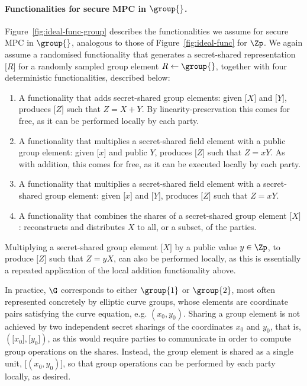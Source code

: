     \paragraph{Functionalities for secure MPC in $\group{}$.}
    Figure~\ref{fig:ideal-func-group} describes the functionalities we assume
    for secure MPC in $\group{}$, analogous to those of
    Figure~\ref{fig:ideal-func} for $\Zp$. We again assume a randomised
    functionality that generates a secret-shared representation $\lbrack
    R\rbrack $ for a randomly sampled group element $R\gets \group{}$, together
    with four deterministic functionalities, described below:

    \begin{enumerate}

      \item A functionality that adds secret-shared group elements: given
        $\lbrack X\rbrack $ and $\lbrack Y\rbrack $, produces $\lbrack Z\rbrack
        $ such that $Z = X + Y$. By linearity-preservation this comes for free,
        as it can be performed locally by each party.

      \item A functionality that multiplies a secret-shared field element with
        a public group element: given $\lbrack x\rbrack $ and public $Y$,
        produces $\lbrack Z\rbrack $ such that $Z = xY$. As with addition, this
        comes for free, as it can be executed locally by each party.

      \item A functionality that multiplies a secret-shared field element with
        a secret-shared group element: given $\lbrack x\rbrack $ and $\lbrack
        Y\rbrack $, produces $\lbrack Z\rbrack $ such that $Z = xY$.

      \item A functionality that combines the shares of a secret-shared group
        element $\lbrack X\rbrack $: reconstructs and distributes $X$ to all,
        or a subset, of the parties.

    \end{enumerate}

    Multiplying a secret-shared group element $\lbrack X\rbrack $ by a public
    value $y \in \Zp$, to produce $\lbrack Z\rbrack $ such that $Z = yX$, can
    also be performed locally, as this is essentially a repeated application of
    the local addition functionality above.

    In practice, $\G$ corresponds to either $\group{1}$ or $\group{2}$, most
    often represented concretely by elliptic curve groups, whose elements are
    coordinate pairs satisfying the curve equation, e.g. $(x_0, y_0)$. Sharing
    a group element is not achieved by two independent secret sharings of the
    coordinates $x_0$ and $y_0$, that is, $(\lbrack x_0\rbrack , \lbrack
    y_0\rbrack )$, as this would require parties to communicate in order to
    compute group operations on the shares. Instead, the group element is
    shared as a single unit, $\lbrack (x_0,y_0)\rbrack $, so that group
    operations can be performed by each party locally, as desired.
